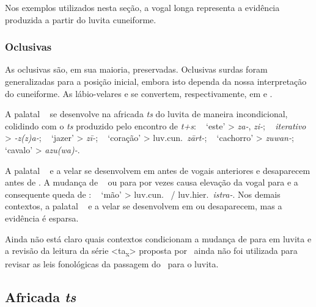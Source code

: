 Nos exemplos utilizados nesta seção, a vogal longa representa a evidência
produzida a partir do luvita cuneiforme.


\subsubsection{Oclusivas}

As oclusivas são, em sua maioria, preservadas.
Oclusivas surdas foram generalizadas para a posição inicial, embora isto dependa
da nossa interpretação do cuneiforme.
As lábio-velares
 e  se convertem,
respectivamente, em  e .

A palatal \pac~ se desenvolve na africada \emph{ts}
do luvita de maneira incondicional, colidindo com o \emph{ts} produzido pelo
encontro de \emph{t+s}:
\pac~ `este' >
\emph{za-}, \emph{zi-};
\pac~ \emph{iterativo} >
\emph{-z{(z)}a-};
\pac~ `jazer' > \emph{zī-};
\pac~ `coração' > luv.cun.\ \emph{zārt-};
\pac~ `cachorro' > \emph{zuwan-};
\pac~ `cavalo' > \emph{azu{(wa)}-}.

A palatal \pac~ e a velar
 se desenvolvem em  antes de vogais
anteriores e desaparecem antes de .
A mudança de \pac~ ou 
para  por vezes causa elevação da vogal  para
 e a consequente queda de :
\pac~ `mão' >
luv.cun.\ \emph{} \slash{} luv.hier.\ \emph{istra-}.
Nos demais contextos, a palatal \pac~ e a velar
 se desenvolvem em  ou desaparecem,
mas a evidência é esparsa.

Ainda não está claro quais contextos condicionam a mudança de
 para  em luvita e a revisão da leitura da
série <ta\textsubscript{x}> proposta por~\citet{Rieken2008} ainda não foi
utilizada para revisar as leis fonológicas da passagem do \pac~para o luvita.

\subsection{Africada \emph{ts}}


